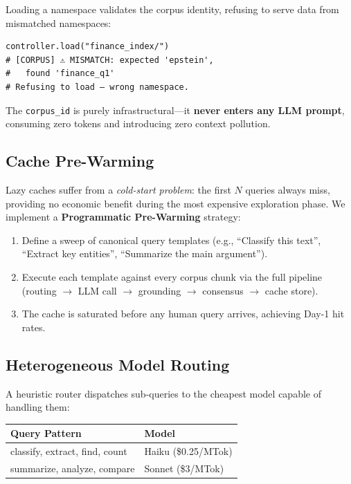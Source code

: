 \documentclass[11pt,twocolumn]{article}
\begin{document}
Loading a namespace validates the corpus identity, refusing to serve data from mismatched namespaces:

\begin{small}
\begin{verbatim}
controller.load("finance_index/")
# [CORPUS] ⚠ MISMATCH: expected 'epstein',
#   found 'finance_q1'
# Refusing to load — wrong namespace.
\end{verbatim}
\end{small}

The \texttt{corpus\_id} is purely infrastructural---it \textbf{never enters any LLM prompt}, consuming zero tokens and introducing zero context pollution.

\subsection{Cache Pre-Warming}
\label{sec:prewarm}

Lazy caches suffer from a \textit{cold-start problem}: the first $N$ queries always miss, providing no economic benefit during the most expensive exploration phase. We implement a \textbf{Programmatic Pre-Warming} strategy:

\begin{enumerate}
    \item Define a sweep of canonical query templates (e.g., ``Classify this text'', ``Extract key entities'', ``Summarize the main argument'').
    \item Execute each template against every corpus chunk via the full pipeline (routing $\to$ LLM call $\to$ grounding $\to$ consensus $\to$ cache store).
    \item The cache is saturated before any human query arrives, achieving Day-1 hit rates.
\end{enumerate}

\subsection{Heterogeneous Model Routing}
\label{sec:routing}

A heuristic router dispatches sub-queries to the cheapest model capable of handling them:

\begin{small}
\begin{tabular}{ll}
\toprule
\textbf{Query Pattern} & \textbf{Model} \\
\midrule
classify, extract, find, count & Haiku (\$0.25/MTok) \\
summarize, analyze, compare & Sonnet (\$3/MTok) \\
\bottomrule
\end{tabular}
\end{small}
\end{document}
